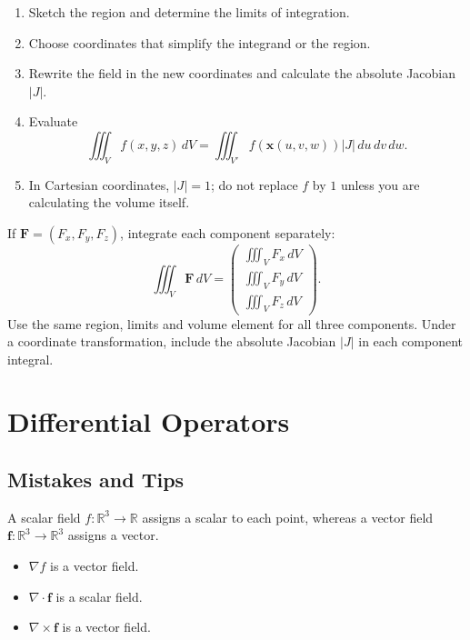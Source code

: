\begin{nmeth}
  \begin{enumerate}\emph{}

    \item Sketch the region and determine the limits of integration.
    \item Choose coordinates that simplify the integrand or the region.
    \item Rewrite the field in the new coordinates and calculate the absolute Jacobian $|J|$.
    \item Evaluate
    \[
      \iiint_V f(x,y,z)\,dV
      =\iiint_{V'} f(\mathbf{x}(u,v,w))|J|\,du\,dv\,dw.
    \]
    \item In Cartesian coordinates, $|J|=1$; do not replace $f$ by $1$ unless you are calculating the volume itself.
  \end{enumerate}
\end{nmeth}

\begin{nmeth}
  If $\mathbf{F}=(F_x,F_y,F_z)$, integrate each component separately:
  \[
    \iiint_V \mathbf{F}\,dV
    =
    \begin{pmatrix}
      \iiint_V F_x\,dV\\
      \iiint_V F_y\,dV\\
      \iiint_V F_z\,dV
    \end{pmatrix}.
  \]
  Use the same region, limits and volume element for all three components. Under a coordinate transformation, include the absolute Jacobian $|J|$ in each component integral.
\end{nmeth}

\section{Differential Operators}


\subsection{Mistakes and Tips}

\begin{mistake}
  A scalar field $f:\mathbb{R}^3\to\mathbb{R}$ assigns a scalar to each point, whereas a vector field $\boldsymbol{f}:\mathbb{R}^3\to\mathbb{R}^3$ assigns a vector.

  \begin{itemize}
    \item $\nabla f$ is a vector field.
    \item $\nabla\cdot\boldsymbol{f}$ is a scalar field.
    \item $\nabla\times\boldsymbol{f}$ is a vector field.
  \end{itemize}
\end{mistake}

